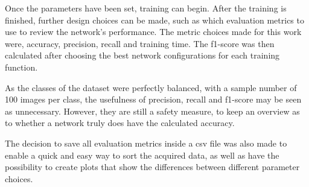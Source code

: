 Once the parameters have been set, training can begin. After the training is finished, further design choices can be made, such as which evaluation metrics to use to review the network's performance. The metric choices made for this work were, accuracy, precision, recall and training time. The f1-score was then calculated after choosing the best network configurations for each training function.

As the classes of the dataset were perfectly balanced, with a sample number of 100 images per class, the usefulness of precision, recall and f1-score may be seen as unnecessary. However, they are still a safety measure, to keep an overview as to whether a network truly does have the calculated accuracy.

The decision to save all evaluation metrics inside a csv file was also made to enable a quick and easy way to sort the acquired data, as well as have the possibility to create plots that show the differences between different parameter choices.